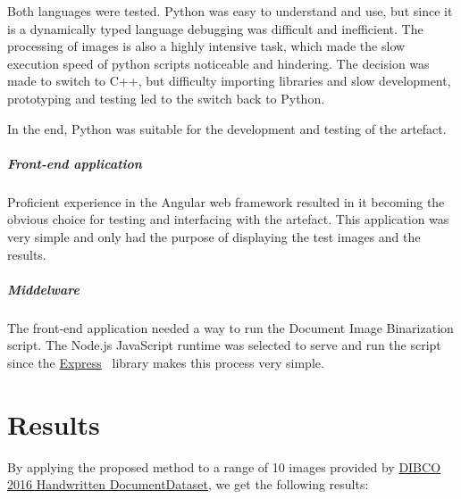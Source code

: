 \documentclass[a4paper, 12pt]{report}
\begin{document}
Both languages were tested. Python was easy to understand and use, but since it
is a dynamically typed language debugging was difficult and inefficient. The
processing of images is also a highly intensive task, which made the slow
execution speed of python scripts noticeable and hindering. The decision was
made to switch to C++, but difficulty importing libraries and slow development,
prototyping and testing led to the switch back to Python.\par

In the end, Python was suitable for the development and testing of the
artefact.

\paragraph{Front-end application}
Proficient experience in the Angular web framework resulted in it becoming the
obvious choice for testing and interfacing with the artefact. This application
was very simple and only had the purpose of displaying the test images and the
results.

\paragraph{Middelware}
The front-end application needed a way to run the Document Image Binarization
script. The Node.js JavaScript runtime was selected to serve and run the script
since the \href{https://expressjs.com/}{Express}~\cite{express} library makes
this process very simple.

\chapter{Results}
By applying the proposed method to a range of 10 images provided by
\href{https://vc.ee.duth.gr/h-dibco2016/}{DIBCO 2016 Handwritten
    DocumentDataset}, we get the following results:
\end{document}
